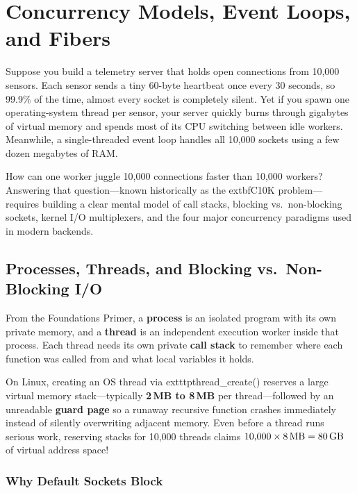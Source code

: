 \chapter{Concurrency Models, Event Loops, and Fibers}
\label{chap:concurrency}

Suppose you build a telemetry server that holds open connections from 10,000 sensors. Each sensor sends a tiny 60-byte heartbeat once every 30 seconds, so 99.9\% of the time, almost every socket is completely silent. Yet if you spawn one operating-system thread per sensor, your server quickly burns through gigabytes of virtual memory and spends most of its CPU switching between idle workers. Meanwhile, a single-threaded event loop handles all 10,000 sockets using a few dozen megabytes of RAM.

How can one worker juggle 10,000 connections faster than 10,000 workers? Answering that question---known historically as the 	extbf{C10K problem}---requires building a clear mental model of call stacks, blocking vs.\ non-blocking sockets, kernel I/O multiplexers, and the four major concurrency paradigms used in modern backends.

\section{Processes, Threads, and Blocking vs.\ Non-Blocking I/O}

From the Foundations Primer, a \textbf{process} is an isolated program with its own private memory, and a \textbf{thread} is an independent execution worker inside that process. Each thread needs its own private \textbf{call stack} to remember where each function was called from and what local variables it holds.

On Linux, creating an OS thread via 	exttt{pthread\_create()} reserves a large virtual memory stack---typically \textbf{2\,MB to 8\,MB} per thread---followed by an unreadable \textbf{guard page} so a runaway recursive function crashes immediately instead of silently overwriting adjacent memory. Even before a thread runs serious work, reserving stacks for 10,000 threads claims $10{,}000 \times 8\text{\,MB} = 80\text{\,GB}$ of virtual address space!

\subsection{Why Default Sockets Block}

